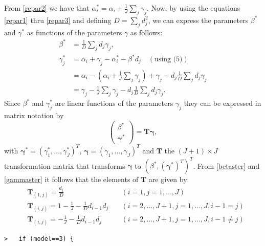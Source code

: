 \documentclass[a4paper]{article}
\begin{document}
From \eqref{repar2} we have that $\alpha^*_i=\alpha_i+\frac{1}{J}\sum_j\gamma_j$.
Now, by using the equations \eqref{repar1} thru \eqref{repar3} and defining
$D=\sum_jd^2_j$, we can express the parameters $\beta^*$ and $\gamma^*$ as
functions of the parameters $\gamma$ as follows:
\begin{align}
  \label{betaster}
  \beta^* &=\frac{1}{D}\sum_jd_j\gamma_j,\\ \nonumber
  \label{gammaster}
  \gamma^*_j &= \alpha_i+\gamma_j-\alpha^*_i-\beta^*d_j  \quad (\text{using (5)})\\ \nonumber
  &=\alpha_i-\left( \alpha_i+\frac{1}{J}\sum_j\gamma_j\right) +\gamma_j-d_j\frac{1}{D}\sum_jd_j\gamma_j \\
  &=\gamma_j-\frac{1}{J}\sum_j\gamma_j-d_j\frac{1}{D}\sum_jd_j\gamma_j.
\end{align}
Since $\beta^*$ and $\gamma^*_j$ are linear functions of the parameters $\gamma_j$
they can be expressed in matrix notation by
\begin{equation}
  \left ( \begin{array} {c}
         \beta^* \\
         \boldsymbol{\gamma}^*
  \end{array} \right ) = \mathbf{T}\boldsymbol{\gamma},
\end{equation}
with $\boldsymbol{\gamma}^*=(\gamma^*_1,\ldots,\gamma^*_J)^T$,
$\boldsymbol{\gamma}=(\gamma_1,\ldots,\gamma_J)^T$ and $\mathbf{T}$
the $(J+1) \times J$ transformation matrix that transforms
$\boldsymbol{\gamma}$ to  $\left (\beta^*,(\boldsymbol{\gamma}^*)^T\right)^T$.
From \eqref{betaster} and \eqref{gammaster} it follows that the elements of
$\mathbf{T}$ are given by:
\begin{align}
  \label{matrixT} \nonumber
  &\mathbf{T}_{(1,j)}=\frac{d_j}{D} &\quad (i=1,j=1,\ldots,J)\\ \nonumber
  &\mathbf{T}_{(i,j)}=1-\frac{1}{J}-\frac{1}{D}d_{i-1}d_j &\quad(i=2,\ldots,J+1,j=1,\ldots,J,i-1=j)\\ \nonumber
  &\mathbf{T}_{(i,j)}=-\frac{1}{J}-\frac{1}{D}d_{i-1}d_j &\quad(i=2,\ldots,J+1,j=1,\ldots,J,i-1 \neq j)
\end{align}\par

\verb~>   if (model==3) {~\par
\end{document}
